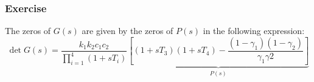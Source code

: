 \subsubsection{Exercise}

The zeros of $G(s)$ are given by the zeros of $P(s)$ in the following expression:
$$
\det G(s) = \frac{k_1k_2c_1c_2}{\prod_{i=1}^{4} (1 + s T_i)}
\underbrace{\left[ (1+sT_3)(1+sT_4) - \frac{(1-\gamma_1)(1 - \gamma_2)}{\gamma_1\gamma2}\right]}_{P(s)}
$$


